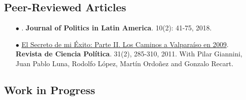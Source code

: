 \subsection*{Peer-Reviewed Articles}


\begin{itemize}

	  \item[$\bullet$] \href{http://github.com/hbahamonde/Clientelism_paper/raw/master/Bahamonde_Clientelism_Paper.pdf}{\unskip}. {\bf Journal of Politics in Latin America}. 10(2): 41-75, 2018.

	  \item[$\bullet$] \href{https://scielo.conicyt.cl/pdf/revcipol/v31n2/art07.pdf}{El Secreto de mi \'Exito: Parte II. Los Caminos a Valpara\'iso en 2009}. {\bf Revista de Ciencia Pol\'itica}. 31(2), 285-310, 2011. With Pilar Giannini, Juan Pablo Luna, Rodolfo L\'opez, Mart\'in Ordo\~nez and Gonzalo Recart.
  
\end{itemize}



\subsection*{Work in Progress}


